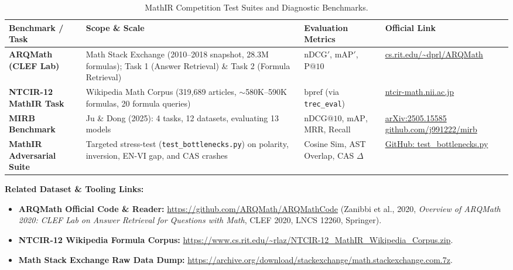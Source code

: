 \documentclass[11pt,a4paper]{article}
\begin{document}
	\begin{table}[H]
		\centering
		\small
		\caption{MathIR Competition Test Suites and Diagnostic Benchmarks.}
		\label{tab:benchmarks}
		\begin{tabularx}{\textwidth}{p{2.9cm} X p{3.5cm} p{3.8cm}}
			\toprule
			\textbf{Benchmark / Task} & \textbf{Scope \& Scale} & \textbf{Evaluation Metrics} & \textbf{Official Link} \\
			\midrule
			\textbf{ARQMath (CLEF Lab)} & Math Stack Exchange (2010--2018 snapshot, 28.3M formulas); Task 1 (Answer Retrieval) \& Task 2 (Formula Retrieval) & $\text{nDCG}'$, $\text{mAP}'$, $\text{P}@10$ & \href{https://www.cs.rit.edu/~dprl/ARQMath/}{\small cs.rit.edu/\textasciitilde dprl/ARQMath} \\
			\addlinespace[4pt]
			\textbf{NTCIR-12 MathIR Task} & Wikipedia Math Corpus (319,689 articles, $\sim$580K--590K formulas, 20 formula queries) & $\text{bpref}$ (via \texttt{trec\_eval}) & \href{http://ntcir-math.nii.ac.jp/}{\small ntcir-math.nii.ac.jp} \\
			\addlinespace[4pt]
			\textbf{MIRB Benchmark} & Ju \& Dong (2025): 4 tasks, 12 datasets, evaluating 13 models & $\text{nDCG}@10$, $\text{mAP}$, MRR, Recall & \href{https://arxiv.org/abs/2505.15585}{\small arXiv:2505.15585} \newline \href{https://github.com/j991222/mirb}{\small github.com/j991222/mirb} \\
			\addlinespace[4pt]
			\textbf{MathIR Adversarial Suite} & Targeted stress-test (\texttt{test\_bottlenecks.py}) on polarity, inversion, EN-VI gap, and CAS crashes & Cosine Sim, AST Overlap, CAS $\Delta$ & \href{https://github.com/Dvhlong55/MathIR/blob/main/tests/test_bottlenecks.py}{\small GitHub: test\_bottlenecks.py} \\
			\bottomrule
		\end{tabularx}
	\end{table}

	\noindent \textbf{Related Dataset \& Tooling Links:}
	\begin{itemize}
		\item \textbf{ARQMath Official Code \& Reader:} \url{https://github.com/ARQMath/ARQMathCode} (Zanibbi et al., 2020, \textit{Overview of ARQMath 2020: CLEF Lab on Answer Retrieval for Questions with Math}, CLEF 2020, LNCS 12260, Springer).
		\item \textbf{NTCIR-12 Wikipedia Formula Corpus:} \url{https://www.cs.rit.edu/~rlaz/NTCIR-12_MathIR_Wikipedia_Corpus.zip}.
		\item \textbf{Math Stack Exchange Raw Data Dump:} \url{https://archive.org/download/stackexchange/math.stackexchange.com.7z}.
	\end{itemize}
\end{document}
